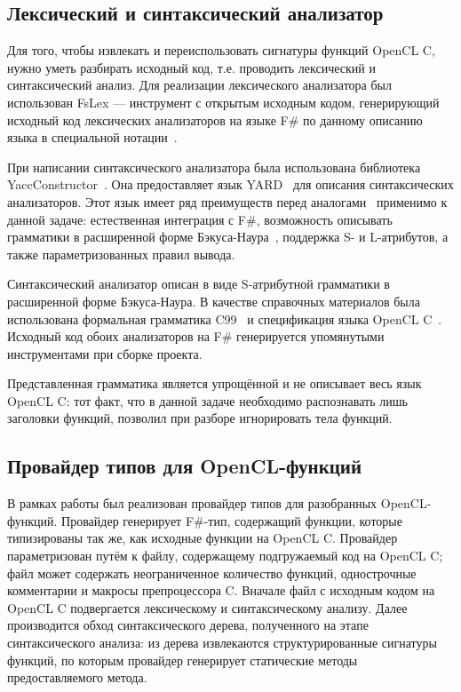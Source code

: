 \documentclass[14pt]{matmex-diploma}
\begin{document}
\subsection{Лексический и синтаксический анализатор}
Для того, чтобы извлекать и переиспользовать сигнатуры функций OpenCL C, нужно уметь разбирать исходный код, т.е. проводить лексический и синтаксический анализ. Для реализации лексического анализатора был использован FsLex --- инструмент с открытым исходным кодом, генерирующий исходный код лексических анализаторов на языке F\# по данному описанию языка в специальной нотации~\cite{FsLex}.

При написании синтаксического анализатора была использована библиотека YaccConstructor~\cite{YaccConstructorPaper, YaccConstructorPage}. Она предоставляет язык YARD~\cite{YARD} для описания синтаксических анализаторов. Этот язык имеет ряд преимуществ перед аналогами~\cite{ANTLR, Yacc} применимо к данной задаче: естественная интеграция с F\#, возможность описывать грамматики в расширенной форме Бэкуса-Наура~\cite{EBNF}, поддержка S- и L-атрибутов, а также параметризованных правил вывода.

Синтаксический анализатор описан в виде S-атрибутной грамматики в расширенной форме Бэкуса-Наура. В качестве справочных материалов была использована формальная грамматика C99~\cite{C99} и спецификация языка OpenCL C~\cite{OpenCL_C}. Исходный код обоих анализаторов на F\# генерируется упомянутыми инструментами при сборке проекта.

Представленная грамматика является упрощённой и не описывает весь язык OpenCL C: тот факт, что в данной задаче необходимо распознавать лишь заголовки функций, позволил при разборе игнорировать тела функций.

\subsection{Провайдер типов для OpenCL-функций}
В рамках работы был реализован провайдер типов для разобранных OpenCL-функций. Провайдер генерирует F\#-тип, содержащий функции, которые типизированы так же, как исходные функции на OpenCL C. Провайдер параметризован путём к файлу, содержащему подгружаемый код на OpenCL C; файл может содержать неограниченное количество функций, однострочные комментарии и макросы препроцессора C. Вначале файл с исходным кодом на OpenCL C подвергается лексическому и синтаксическому анализу. Далее производится обход синтаксического дерева, полученного на этапе синтаксического анализа: из дерева извлекаются структурированные сигнатуры функций, по которым провайдер генерирует статические методы предоставляемого метода.
\end{document}
